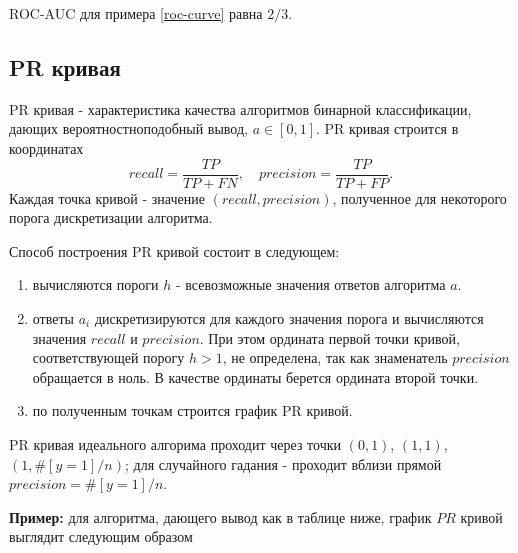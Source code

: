 ROC-AUC для примера \ref{roc-curve} равна $2/3$.

\subsection{PR кривая}\label{pr-curve}

PR кривая - характеристика качества алгоритмов бинарной классификации, дающих вероятностноподобный вывод, $a\in[0, 1]$. 
PR кривая строится в координатах 
$$
recall = \frac{TP}{TP + FN}, \quad precision = \frac{TP}{TP + FP}.
$$
Каждая точка кривой - значение $(recall, precision)$, полученное для некоторого порога дискретизации алгоритма. 

Способ построения PR кривой состоит в следующем:
\begin{enumerate}
    \item вычисляются пороги $h$ - всевозможные значения ответов алгоритма $a$.
    \item ответы $a_i$ дискретизируются для каждого значения порога и вычисляются значения $recall$ и $precision$. При этом ордината первой точки кривой, соответствующей порогу $h>1$, не определена, так как знаменатель $precision$ обращается в ноль. В качестве ординаты берется ордината второй точки.
    \item по полученным точкам строится график PR кривой. 
\end{enumerate}

PR кривая идеального алгорима проходит через точки $(0,1)$, $(1,1)$, $(1,\#[y=1]/n)$; для случайного гадания - проходит вблизи прямой $precision = \#[y=1]/n$.

\textbf{Пример:} для алгоритма, дающего вывод как в таблице ниже, график $PR$ кривой выглядит следующим образом

